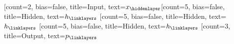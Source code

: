 \documentclass[convert]{standalone}
\begin{document}
\begin{neuralnetwork}[height=4.5]
    \newcommand{\nodetextclear}[2]{}
    \newcommand{\nodetextx}[2]{$x_#2$}
    \newcommand{\nodetextp}[2]{$p_#2$}
    \newcommand{\nodetexth}[2]{$h_#2$}
    [count=2, bias=false, title=Input, text=\nodetextx]
    \hiddenlayer[count=5, bias=false, title=Hidden, text=\nodetexth] \linklayers
    \hiddenlayer[count=5, bias=false, title=Hidden, text=\nodetexth] \linklayers
    \hiddenlayer[count=5, bias=false, title=Hidden, text=\nodetexth] \linklayers
    \outputlayer[count=3, title=Output, text=\nodetextp] \linklayers
\end{neuralnetwork}
\end{document}
